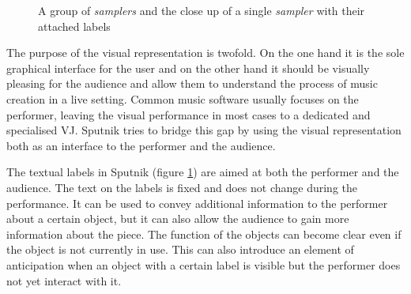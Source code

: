 \documentclass[10pt,a4paper]{scrartcl}
\begin{document}
\begin{figure}[hbtp]
\begin{center}
\caption{A group of \emph{samplers} and the close up of a single \emph{sampler} with their attached labels}
\label{fig:sampler-labels}
\end{center}
\end{figure}


The purpose of the visual representation is twofold. On the one hand it is the sole graphical interface for the user and on the other hand it should be visually pleasing for the audience and allow them to understand the process of music creation in a live setting. Common music software usually focuses on the performer, leaving the visual performance in most cases to a dedicated and specialised VJ. Sputnik tries to bridge this gap by using the visual representation both as an interface to the performer and the audience. 

The textual labels in Sputnik (figure \ref{fig:sampler-labels}) are aimed at both the performer and the audience. The text on the labels is fixed and does not change during the performance. It can be used to convey additional information to the performer about a certain object, but it can also allow the audience to gain more information about the piece. The function of the objects can become clear even if the object is not currently in use. This can also introduce an element of anticipation when an object with a certain label is visible but the performer does not yet interact with it.
\end{document}
